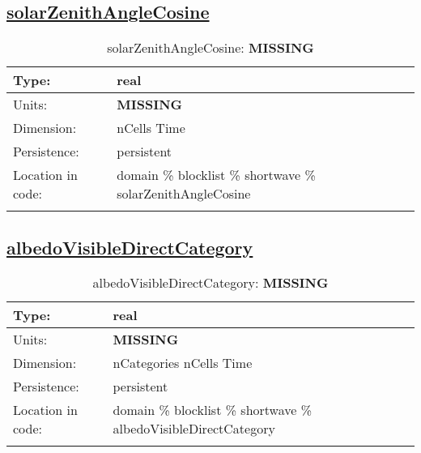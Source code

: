\subsection[solarZenithAngleCosine]{\hyperref[sec:var_tab_shortwave]{solarZenithAngleCosine}}
\label{subsec:var_sec_shortwave_solarZenithAngleCosine}
\begin{center}
\begin{longtable}{| p{2.0in} | p{4.0in} |}
        \hline 
        Type: & real \\
        \hline 
        Units: & {\bf \color{red} MISSING} \\
        \hline 
        Dimension: & nCells Time \\
        \hline 
        Persistence: & persistent \\
        \hline 
         Location in code: & domain \% blocklist \% shortwave \% solarZenithAngleCosine \\
         \hline 
    \caption{solarZenithAngleCosine: {\bf \color{red} MISSING}}
\end{longtable}
\end{center}
\subsection[albedoVisibleDirectCategory]{\hyperref[sec:var_tab_shortwave]{albedoVisibleDirectCategory}}
\label{subsec:var_sec_shortwave_albedoVisibleDirectCategory}
\begin{center}
\begin{longtable}{| p{2.0in} | p{4.0in} |}
        \hline 
        Type: & real \\
        \hline 
        Units: & {\bf \color{red} MISSING} \\
        \hline 
        Dimension: & nCategories nCells Time \\
        \hline 
        Persistence: & persistent \\
        \hline 
         Location in code: & domain \% blocklist \% shortwave \% albedoVisibleDirectCategory \\
         \hline 
    \caption{albedoVisibleDirectCategory: {\bf \color{red} MISSING}}
\end{longtable}
\end{center}
